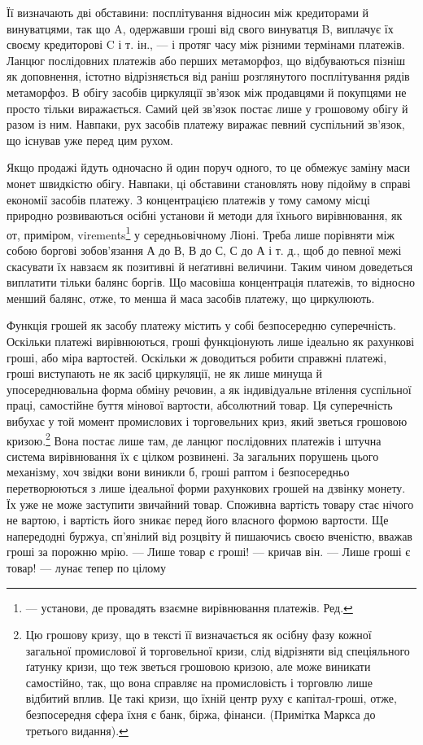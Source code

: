Її визначають дві обставини: посплітування відносин між кредиторами й винуватцями, так що A,
одержавши гроші від свого винуватця B, виплачує їх своєму кредиторові C і т. ін., — і протяг часу
між різними термінами платежів. Ланцюг послідовних платежів або перших метаморфоз, що відбуваються
пізніш як доповнення, істотно відрізняється від раніш розглянутого посплітування рядів метаморфоз. В
обігу засобів циркуляції зв’язок між продавцями й покупцями не просто тільки виражається. Самий цей
зв’язок постає лише у грошовому обігу й разом із ним. Навпаки, рух засобів платежу виражає певний
суспільний зв’язок, що існував уже перед цим рухом.

Якщо продажі йдуть одночасно й один поруч одного, то це обмежує заміну маси монет швидкістю обігу.
Навпаки, ці обставини становлять нову підойму в справі економії засобів платежу. З концентрацією
платежів у тому самому місці природно розвиваються осібні установи й методи для їхнього
вирівнювання, як от, приміром, virements\footnote*{
— установи, де провадять взаємне вирівнювання платежів. Ред.
} у середньовічному Ліоні. Треба лише порівняти між собою
боргові зобов’язання А до В, В до С, С до А і т. д., щоб до певної межі скасувати їх навзаєм як
позитивні й неґативні величини. Таким чином доведеться виплатити тільки балянс боргів. Що масовіша
концентрація платежів, то відносно менший балянс, отже, то менша й маса засобів платежу, що
циркулюють.

Функція грошей як засобу платежу містить у собі безпосередню суперечність. Оскільки платежі
вирівнюються, гроші функціонують лише ідеально як рахункові гроші, або міра вартостей. Оскільки ж
доводиться робити справжні платежі, гроші
виступають не як засіб циркуляції, не як лише минуща й упосереднювальна форма обміну речовин, а як
індивідуальне втілення суспільної праці, самостійне буття мінової вартости, абсолютний товар. Ця
суперечність вибухає у той момент промислових і торговельних криз, який зветься грошовою кризою.\footnote{
Цю грошову кризу, що в тексті її визначається як осібну фазу кожної загальної промислової й
торговельної кризи, слід відрізняти від спеціяльного ґатунку кризи, що теж зветься грошовою кризою,
але може виникати самостійно, так, що вона справляє на промисловість і торговлю лише відбитий вплив.
Це такі кризи, що їхній центр руху є капітал-гроші, отже, безпосередня сфера їхня є банк, біржа,
фінанси. (Примітка Маркса до третього видання).
}
Вона постає лише там, де ланцюг послідовних платежів і штучна система вирівнювання їх є цілком
розвинені. За загальних порушень цього механізму, хоч звідки вони виникли б, гроші раптом і
безпосередньо перетворюються з лише ідеальної форми рахункових грошей на дзвінку монету. Їх уже не
може заступити звичайний товар. Споживна вартість товару стає нічого не вартою, і вартість його
зникає перед його власного формою вартости. Ще напередодні буржуа, сп’янілий від розцвіту й
пишаючись своєю вченістю, вважав гроші за порожню мрію. — Лише товар є гроші! — кричав він. — Лише
гроші є товар! — лунає тепер по цілому